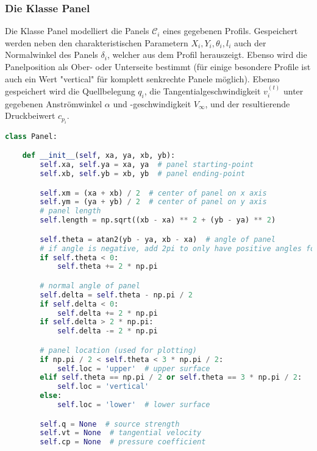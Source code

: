 \subsubsection{Die Klasse Panel}
Die Klasse Panel modelliert die Panels $\mathcal{C}_i$ eines gegebenen Profils. Gespeichert werden neben den charakteristischen Parametern $X_i, Y_i, \theta _i, l_i$ auch der Normalwinkel des Panels $\delta_i$, welcher aus dem Profil herauszeigt. Ebenso wird die Panelposition als Ober- oder Unterseite bestimmt (für einige besondere Profile ist auch ein Wert "vertical" für komplett senkrechte Panele möglich). Ebenso gespeichert wird die Quellbelegung $q_i$, die Tangentialgeschwindigkeit $v_i^{(t)}$ unter gegebenen Anströmwinkel $\alpha $ und -geschwindigkeit $V_{\infty}$, und der resultierende Druckbeiwert $c_{p_i}$.
\begin{lstlisting}[language=Python]
class Panel:

    def __init__(self, xa, ya, xb, yb):
        self.xa, self.ya = xa, ya  # panel starting-point
        self.xb, self.yb = xb, yb  # panel ending-point

        self.xm = (xa + xb) / 2  # center of panel on x axis
        self.ym = (ya + yb) / 2  # center of panel on y axis
 		# panel length       
        self.length = np.sqrt((xb - xa) ** 2 + (yb - ya) ** 2)  

        self.theta = atan2(yb - ya, xb - xa)  # angle of panel
        # if angle is negative, add 2pi to only have positive angles for plotting
        if self.theta < 0:  
            self.theta += 2 * np.pi

        # normal angle of panel
        self.delta = self.theta - np.pi / 2  
        if self.delta < 0:
            self.delta += 2 * np.pi
        if self.delta > 2 * np.pi:
            self.delta -= 2 * np.pi

        # panel location (used for plotting)
        if np.pi / 2 < self.theta < 3 * np.pi / 2:
            self.loc = 'upper'  # upper surface
        elif self.theta == np.pi / 2 or self.theta == 3 * np.pi / 2:
            self.loc = 'vertical'
        else:
            self.loc = 'lower'  # lower surface

        self.q = None  # source strength
        self.vt = None  # tangential velocity
        self.cp = None  # pressure coefficient
\end{lstlisting}

